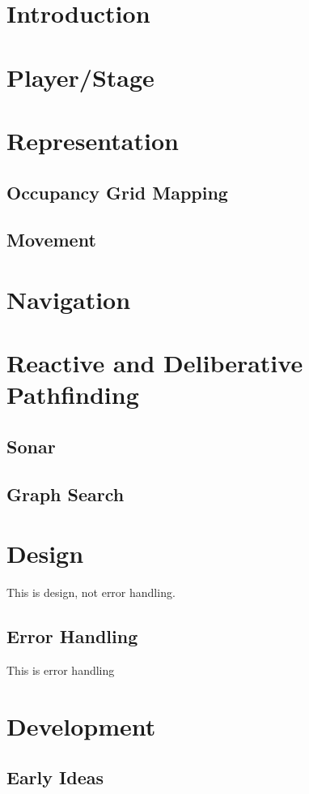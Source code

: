 \documentclass[a4paper,12pt]{article}
\begin{document}

\thispagestyle{empty} %
\tableofcontents %
\clearpage
{} %

\section{Introduction}
\section{Player/Stage}
\section{Representation}
\subsection{Occupancy Grid Mapping}
\subsection{Movement}
\section{Navigation}
\section{Reactive and Deliberative Pathfinding}
\subsection{Sonar}
\subsection{Graph Search}
\section{Design}
This is design, not error handling.
\subsection{Error Handling}
This is error handling
\section{Development}
\subsection{Early Ideas}
\end{document}
